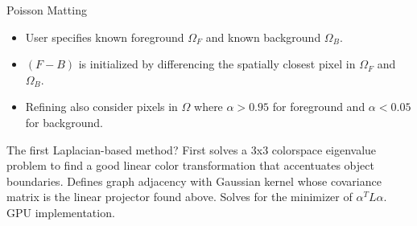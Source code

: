 \documentclass{beamer}
\begin{document}
\begin{frame}[allowframebreaks]{Poisson Matting \cite{sun2004poisson}}
\begin{figure}
 \end{figure}
 \begin{itemize}
  \item User specifies known foreground $\Omega_F$ and known background
        $\Omega_B$.
  \item $(F-B)$ is initialized by differencing the spatially closest pixel
        in $\Omega_F$ and $\Omega_B$.
  \item Refining also consider pixels in $\Omega$ where $\alpha > 0.95$ for
        foreground and $\alpha < 0.05$ for background.
 \end{itemize}
\end{frame}

\begin{frame}[allowframebreaks]{\cite{grady2005random}}
 The first Laplacian-based method?
 First solves a 3x3 colorspace eigenvalue problem to find a good linear
 color transformation that accentuates object boundaries.
 Defines graph adjacency with Gaussian kernel whose covariance matrix is
 the linear projector found above.
 Solves for the minimizer of $\alpha^TL\alpha$.
 GPU implementation.
\end{frame}
\end{document}

